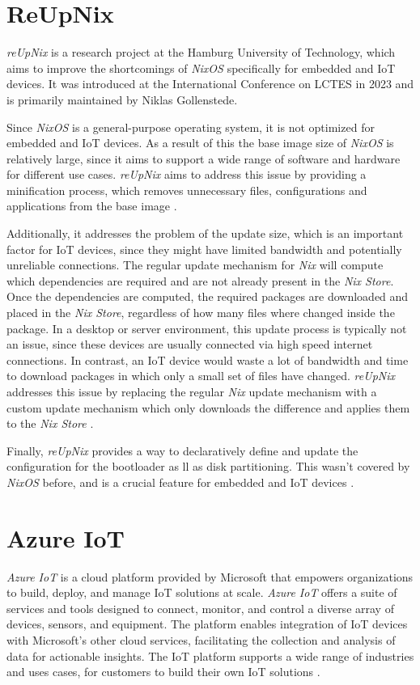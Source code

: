 \section{ReUpNix}
\textit{reUpNix} is a research project at the Hamburg University of Technology,
which aims to improve the shortcomings of \textit{NixOS} specifically for
embedded and \ac{IoT} devices. It was introduced at the International Conference on
\ac{LCTES} in 2023 and is primarily maintained by Niklas Gollenstede.

Since \textit{NixOS} is a general-purpose operating system, it is not optimized
for embedded and \ac{IoT} devices. As a result of this the base image size of
\textit{NixOS} is relatively large, since it aims to support a wide range of
software and hardware for different use cases. \textit{reUpNix} aims to address
this issue by providing a minification process, which removes unnecessary
files, configurations and applications from the base image \cite{gollenstede:23:lctes}.

Additionally, it addresses the problem of the update size, which is an important
factor for \ac{IoT} devices, since they might have limited bandwidth and
potentially unreliable connections. The regular update mechanism for \textit{Nix}
will compute which dependencies are required and are not already present in the \textit{Nix Store}.
Once the dependencies are computed, the required packages are downloaded and
placed in the \textit{Nix Store}, regardless of how many files where changed inside
the package. In a desktop or server environment, this
update process is typically not an issue, since these devices are usually
connected via high speed internet connections. In contrast, an \ac{IoT} device
would waste a lot of bandwidth and time to download packages in which only a
small set of files have changed. \textit{reUpNix} addresses this issue by
replacing the regular \textit{Nix} update mechanism with a custom update mechanism
which only downloads the difference and applies them to the \textit{Nix Store}
\cite{gollenstede:23:lctes}.

Finally, \textit{reUpNix} provides a way to declaratively define and update
the configuration for the bootloader as ll as disk partitioning. This wasn't
covered by \textit{NixOS} before, and is a crucial feature for embedded and
\ac{IoT} devices \cite{gollenstede:23:lctes}.

\section{Azure IoT}
\textit{Azure IoT} is a cloud platform provided by Microsoft that
empowers organizations to build, deploy, and manage \ac{IoT} solutions at scale.
\textit{Azure IoT} offers a suite of services and tools designed to connect,
monitor, and control a diverse array of devices, sensors, and equipment. The
platform enables integration of \ac{IoT} devices with Microsoft's other cloud
services, facilitating the collection and analysis of data for actionable insights.
The \ac{IoT} platform supports a wide range of industries and uses cases,
for customers to build their own \ac{IoT} solutions \cite{msdoc-aziot}.

